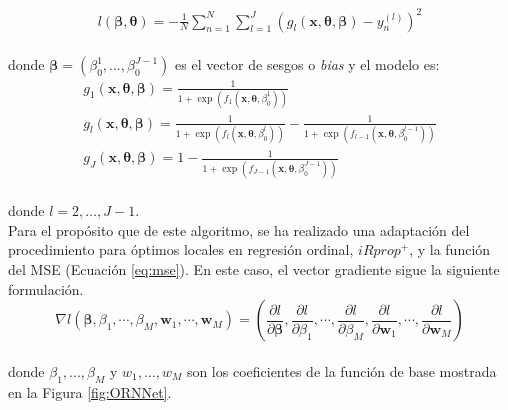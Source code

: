 		\begin{eqnarray}
			l(\boldsymbol{\beta},\boldsymbol{\theta})=-\frac{1}{N}\sum_{n=1}^N \sum_{l=1}^J \left( g_{l}(\mathbf{x},\boldsymbol{\theta},{\boldsymbol \beta})-y_n^{(l)}\right)^2
			\label{eq:mse}
		\end{eqnarray}\\
		
		donde $\boldsymbol{\beta}=(\beta_0^1,...,\beta_0^{J-1})$ es el vector de sesgos o \textit{bias} y el modelo es:\\
		
		\begin{eqnarray}
			g_{1}(\mathbf{x},\boldsymbol{\theta},{\boldsymbol \beta})= \displaystyle \frac{1}{1+\exp(f_1(\mathbf{x},{\boldsymbol \theta},\beta^1_0))} \\
			g_{l}(\mathbf{x},\boldsymbol{\theta},{\boldsymbol \beta})= \displaystyle \frac{1}{1+\exp(f_l(\mathbf{x},{\boldsymbol \theta},\beta^l_0))}-\frac{1}{1+\exp(f_{l-1}(\mathbf{x},{\boldsymbol \theta},\beta^{l-1}_0))}  \\
			g_{J}(\mathbf{x},\boldsymbol{\theta},{\boldsymbol \beta})= \displaystyle 1-\frac{1}{1+\exp(f_{J-1}(\mathbf{x},{\boldsymbol \theta},\beta^{J-1}_0))}
			\label{modelo}
		\end{eqnarray}\\
		
		donde $l = 2,\dots,J-1$.\\
		
		Para el propósito que de este algoritmo, se ha realizado una adaptación del procedimiento para óptimos locales en regresión ordinal, $iRprop^{+}$, y la función del MSE (Ecuación \ref{eq:mse}). En este caso, el vector gradiente sigue la siguiente formulación.\\
		
		\begin{equation}
			\nabla l(\boldsymbol{\beta},\beta_1,\cdots,\beta_M, \mathbf{w}_1,\cdots,\mathbf{w}_M) = \left(\frac{\partial l}{\partial \boldsymbol{\beta}},\frac{\partial l}{\partial \beta_1},\cdots,\frac{\partial l}{\partial \beta_M},\frac{\partial l}{\partial \mathbf{w}_1},\cdots, \frac{\partial l}{\partial \mathbf{w}_M} \right) \nonumber
			\label{gradient_vector}
		\end{equation}\\
		
		donde $\beta_1,...,\beta_M$ y $w_1,...,w_M$ son los coeficientes de la función de base mostrada en la Figura \ref{fig:ORNNet}.\\

